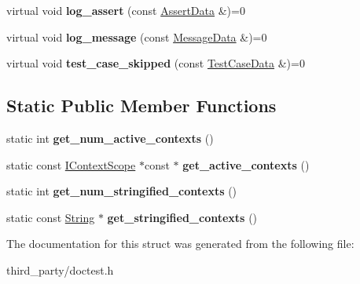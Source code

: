 \begin{DoxyCompactItemize}
\item 
\mbox{\label{structdoctest_1_1_i_reporter_a5bb54923eab233bb02f2fcfc178fa12a}} 
virtual void {\bfseries log\+\_\+assert} (const \mbox{\hyperlink{structdoctest_1_1_assert_data}{Assert\+Data}} \&)=0
\item 
\mbox{\label{structdoctest_1_1_i_reporter_a2b2cb4f15aa7417d4903a0edc3147018}} 
virtual void {\bfseries log\+\_\+message} (const \mbox{\hyperlink{structdoctest_1_1_message_data}{Message\+Data}} \&)=0
\item 
\mbox{\label{structdoctest_1_1_i_reporter_ab4ecfea9cd9582aad4a5e90e0c8ba45d}} 
virtual void {\bfseries test\+\_\+case\+\_\+skipped} (const \mbox{\hyperlink{structdoctest_1_1_test_case_data}{Test\+Case\+Data}} \&)=0
\end{DoxyCompactItemize}
\subsection*{Static Public Member Functions}
\begin{DoxyCompactItemize}
\item 
\mbox{\label{structdoctest_1_1_i_reporter_a7d520de46d9104c0eeb02375fabad32d}} 
static int {\bfseries get\+\_\+num\+\_\+active\+\_\+contexts} ()
\item 
\mbox{\label{structdoctest_1_1_i_reporter_a67a2da62d754d3b517d6d50ef210a988}} 
static const \mbox{\hyperlink{structdoctest_1_1_i_context_scope}{I\+Context\+Scope}} $\ast$const  $\ast$ {\bfseries get\+\_\+active\+\_\+contexts} ()
\item 
\mbox{\label{structdoctest_1_1_i_reporter_ac8b96fef046edc609a3374a61b84797d}} 
static int {\bfseries get\+\_\+num\+\_\+stringified\+\_\+contexts} ()
\item 
\mbox{\label{structdoctest_1_1_i_reporter_acc1a86891876a957c6fc382af7894f99}} 
static const \mbox{\hyperlink{classdoctest_1_1_string}{String}} $\ast$ {\bfseries get\+\_\+stringified\+\_\+contexts} ()
\end{DoxyCompactItemize}


The documentation for this struct was generated from the following file\+:\begin{DoxyCompactItemize}
\item 
third\+\_\+party/doctest.\+h\end{DoxyCompactItemize}
